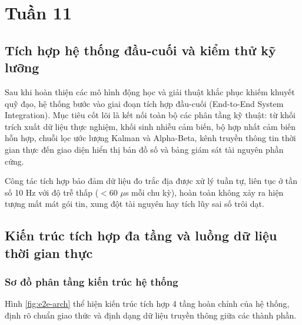 \section{Tuần 11}

\subsection{Tích hợp hệ thống đầu-cuối và kiểm thử kỹ lưỡng}

\hspace{0.5cm} Sau khi hoàn thiện các mô hình động học và giải thuật khắc phục khiếm khuyết quỹ đạo, hệ thống bước vào giai đoạn tích hợp đầu-cuối (End-to-End System Integration). Mục tiêu cốt lõi là kết nối toàn bộ các phân tầng kỹ thuật: từ khối trích xuất dữ liệu thực nghiệm, khối sinh nhiễu cảm biến, bộ hợp nhất cảm biến hỗn hợp, chuỗi lọc ước lượng Kalman và Alpha-Beta, kênh truyền thông tin thời gian thực đến giao diện hiển thị bản đồ số và bảng giám sát tài nguyên phần cứng.

Công tác tích hợp bảo đảm dữ liệu đo trắc địa được xử lý tuần tự, liên tục ở tần số 10 Hz với độ trễ thấp ($< 60$ $\mu$s mỗi chu kỳ), hoàn toàn không xảy ra hiện tượng mất mát gói tin, xung đột tài nguyên hay tích lũy sai số trôi dạt.

\subsection{Kiến trúc tích hợp đa tầng và luồng dữ liệu thời gian thực}

\subsubsection{Sơ đồ phân tầng kiến trúc hệ thống}

\hspace{0.5cm} Hình \ref{fig:e2e-arch} thể hiện kiến trúc tích hợp 4 tầng hoàn chỉnh của hệ thống, định rõ chuẩn giao thức và định dạng dữ liệu truyền thông giữa các thành phần.

